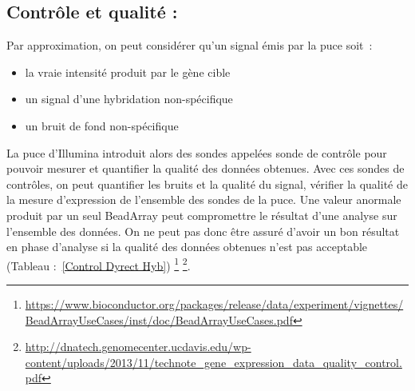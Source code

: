 \documentclass[a4paper,10pt]{article}
\begin{document}
\subsection{ Contrôle et qualité :}
Par approximation, on peut considérer qu’un signal émis par la puce soit :
\begin{itemize}
 \item la vraie intensité produit par le gène cible
 \item un signal d’une hybridation non-spécifique
 \item un bruit de fond non-spécifique
\end{itemize}
La puce d’Illumina introduit alors des sondes appelées sonde de contrôle pour pouvoir mesurer et quantifier la qualité des données obtenues.
Avec ces sondes de contrôles, on peut quantifier les bruits et la qualité du signal, vérifier la qualité de la mesure d’expression de l'ensemble des sondes de la puce. 
Une valeur anormale produit par un seul BeadArray peut compromettre le résultat d’une analyse sur l’ensemble des données. 
On ne peut pas donc être assuré d’avoir un bon résultat en phase d’analyse si la qualité des données obtenues n’est pas acceptable (Tableau :~\ref{Control Dyrect  Hyb})
\footnote{\url{https://www.bioconductor.org/packages/release/data/experiment/vignettes/BeadArrayUseCases/inst/doc/BeadArrayUseCases.pdf}}
\footnote{\url{http://dnatech.genomecenter.ucdavis.edu/wp-content/uploads/2013/11/technote\_gene\_expression\_data\_quality\_control.pdf}}.
\end{document}
